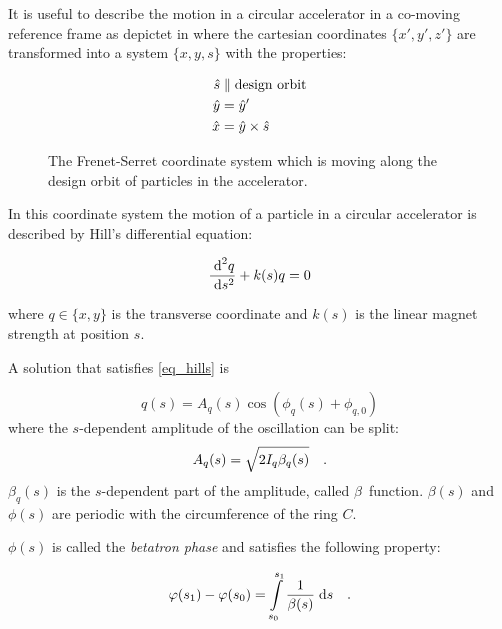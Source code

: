 It is useful to describe the motion in a circular accelerator in a co-moving reference frame as
depictet in  where the cartesian coordinates $\{x', y', z'\}$ are
transformed into a system $\{x,y,s\}$ with the properties:

\begin{align}
    \hat{s} &\parallel \text{design orbit}\notag\\
    \hat{y} &= \hat{y}'\notag\\
    \hat{x} &= \hat{y} \times \hat{s}
\end{align}


\begin{figure}[h]
    
    \caption{
        The Frenet-Serret coordinate system which is moving along the design orbit of particles
        in the accelerator.
    }
    \label{fig_frenet_serret}
\end{figure}

In this coordinate system the motion of a particle in a circular accelerator is described by Hill's
differential equation:

\begin{equation}
    \frac{\;\text{d}^2 q}{\;\text{d} s^2} + k(s)q = 0
    \label{eq_hills}
\end{equation}

where $q \in \{x,y\}$ is the transverse coordinate and $k(s)$ is the linear magnet strength at
position $s$.

A solution that satisfies \eqref{eq_hills} is

\begin{equation}
    q(s) = A_q(s) \cos\left(\phi_q(s) + \phi_{q,0} \right)
    \label{eq_betatron_osc}
\end{equation}
where the $s$-dependent amplitude of the oscillation can be split:
\begin{equation}
    A_q(s) = \sqrt{2I_q \beta_q(s)}
    \quad .
    \label{eq_betatron_ampl}
\end{equation}
$\beta_q(s)$ is the $s$-dependent part of the amplitude, called $\beta$~function. $\beta(s)$ and 
$\phi(s)$ are periodic with the circumference of the ring $C$.

$\phi(s)$ is called the \emph{betatron phase} and satisfies the following property:

\begin{equation}
    \varphi(s_1) - \varphi(s_0) = \int\limits_{s_0}^{s_1} \frac{1}{\beta(s)}\;\text{d} s
    \quad .
    \label{eq_phase}
\end{equation}

